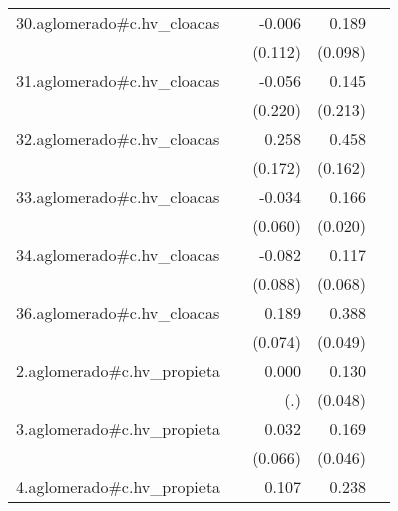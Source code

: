 {\begin{longtable}{l*{4}{D{.}{.}{-1}}}
\addlinespace
30.aglomerado#c.hv\_cloacas&                     &      -0.006         &       0.189         &                     \\
            &                     &     (0.112)         &     (0.098)         &                     \\
\addlinespace
31.aglomerado#c.hv\_cloacas&                     &      -0.056         &       0.145         &                     \\
            &                     &     (0.220)         &     (0.213)         &                     \\
\addlinespace
32.aglomerado#c.hv\_cloacas&                     &       0.258         &       0.458\sym{**} &                     \\
            &                     &     (0.172)         &     (0.162)         &                     \\
\addlinespace
33.aglomerado#c.hv\_cloacas&                     &      -0.034         &       0.166\sym{***}&                     \\
            &                     &     (0.060)         &     (0.020)         &                     \\
\addlinespace
34.aglomerado#c.hv\_cloacas&                     &      -0.082         &       0.117         &                     \\
            &                     &     (0.088)         &     (0.068)         &                     \\
\addlinespace
36.aglomerado#c.hv\_cloacas&                     &       0.189\sym{*}  &       0.388\sym{***}&                     \\
            &                     &     (0.074)         &     (0.049)         &                     \\
\addlinespace
2.aglomerado#c.hv\_propieta&                     &       0.000         &       0.130\sym{**} &                     \\
            &                     &         (.)         &     (0.048)         &                     \\
\addlinespace
3.aglomerado#c.hv\_propieta&                     &       0.032         &       0.169\sym{***}&                     \\
            &                     &     (0.066)         &     (0.046)         &                     \\
\addlinespace
4.aglomerado#c.hv\_propieta&                     &       0.107         &       0.238\sym{***}&                     \\

\end{longtable}}
